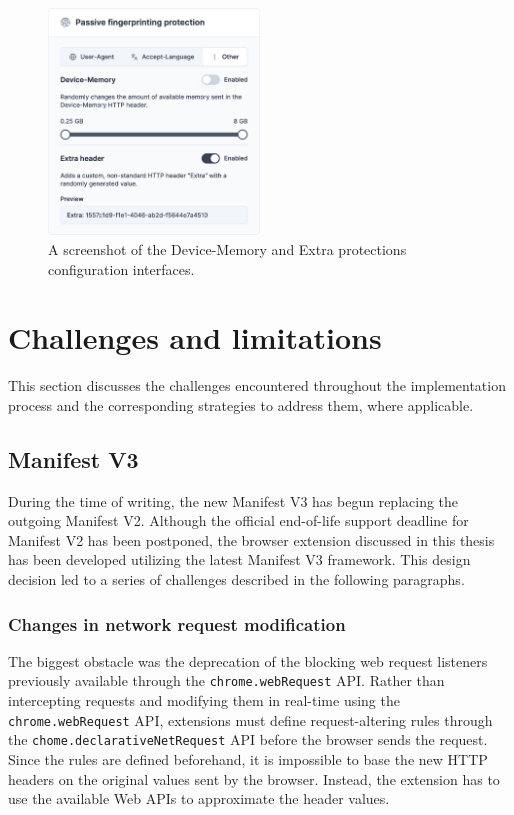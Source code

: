 \begin{figure}[H]
    \centering
    \includegraphics[width=0.5\textwidth]{obrazky-figures/screenshot-other}
    \caption{A screenshot of the Device-Memory and Extra protections configuration interfaces.}
\end{figure}

\section{Challenges and limitations}
\label{Section:Challenges}

This section discusses the challenges encountered throughout the implementation process and the corresponding strategies to address them, where applicable.

\subsection{Manifest V3}

During the time of writing, the new Manifest V3 has begun replacing the outgoing Manifest V2. Although the official end-of-life support deadline for Manifest V2 has been postponed, the browser extension discussed in this thesis has been developed utilizing the latest Manifest V3 framework. This design decision led to a series of challenges described in the following paragraphs.

\subsubsection{Changes in network request modification}

The biggest obstacle was the deprecation of the blocking web request listeners previously available through the \texttt{chrome.webRequest} API. Rather than intercepting requests and modifying them in real-time using the \texttt{chrome.webRequest} API, extensions must define request-altering rules through the \texttt{chome.declarativeNetRequest} API before the browser sends the request. Since the rules are defined beforehand, it is impossible to base the new HTTP headers on the original values sent by the browser. Instead, the extension has to use the available Web APIs to approximate the header values.

